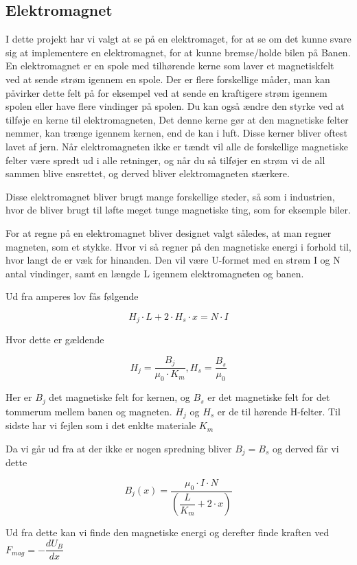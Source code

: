 \subsection{Elektromagnet}
I dette projekt har vi valgt at se på en elektromaget, for at se om det kunne svare sig at implementere en elektromagnet, for at kunne bremse/holde bilen på Banen.\\
En elektromagnet er en spole med tilhørende kerne som laver et magnetiskfelt ved at sende strøm igennem en spole. Der er flere forskellige måder, man kan påvirker dette felt på for eksempel ved at sende en kraftigere strøm igennem spolen eller have flere vindinger på spolen. Du kan også ændre den styrke ved at tilføje en kerne til elektromagneten, Det denne kerne gør at den magnetiske felter nemmer, kan trænge igennem kernen, end de kan i luft. Disse kerner bliver oftest lavet af jern.
Når elektromagneten ikke er tændt vil alle de forskellige magnetiske felter være spredt ud i alle retninger, og når du så tilføjer en strøm vi de all sammen blive ensrettet, og derved bliver elektromagneten stærkere.

Disse elektromagnet bliver brugt mange forskellige steder, så som i industrien, hvor de bliver brugt til løfte meget tunge magnetiske ting, som for eksemple biler.
 
For at regne på en elektromagnet bliver designet valgt således, at man regner magneten, som et stykke. Hvor vi så regner på den magnetiske energi i forhold til, hvor langt de er væk for hinanden. Den vil være U-formet med en strøm I og N antal vindinger, samt en længde L igennem elektromagneten og banen.


Ud fra amperes lov fås følgende


$$H_j \cdot L+2 \cdot H_s \cdot x = N \cdot I$$

Hvor dette er gældende

$$H_j = \dfrac{B_j}{\mu_0 \cdot K_m}, H_s = \dfrac{B_s}{\mu_0}$$

Her er $B_j$ det magnetiske felt for kernen, og $B_s$ er det magnetiske felt for det tommerum mellem banen og magneten. $H_j$ og $H_s$ er de til hørende H-felter. Til sidste har vi fejlen som i det enklte materiale $K_m$

Da vi går ud fra at der ikke er nogen spredning bliver $B_j = B_s$ og derved får vi dette


$$B_j(x) = \dfrac{\mu_0 \cdot I \cdot N}{(\dfrac{L}{K_m}+2 \cdot x)}$$

Ud fra dette kan vi finde den magnetiske energi og derefter finde kraften ved $F_{mag} = -\dfrac{dU_B}{dx}$

